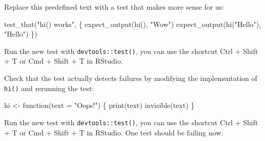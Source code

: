 \documentclass[]{book}
\newenvironment{Shaded}{}{}
\newcommand{\ControlFlowTok}[1]{\textcolor[rgb]{0.00,0.00,1.00}{#1}}
\newcommand{\DataTypeTok}[1]{#1}
\newcommand{\KeywordTok}[1]{\textcolor[rgb]{0.00,0.00,1.00}{#1}}
\newcommand{\NormalTok}[1]{#1}
\newcommand{\StringTok}[1]{\textcolor[rgb]{0.00,0.50,0.50}{#1}}
\begin{document}
Replace this predefined text with a test that makes more sense for us:

\begin{Shaded}
\begin{Highlighting}[]
\KeywordTok{test_that}\NormalTok{(}\StringTok{"hi() works"}\NormalTok{, \{}
  \KeywordTok{expect_output}\NormalTok{(}\KeywordTok{hi}\NormalTok{(), }\StringTok{"Wow"}\NormalTok{)}
  \KeywordTok{expect_output}\NormalTok{(}\KeywordTok{hi}\NormalTok{(}\StringTok{"Hello"}\NormalTok{), }\StringTok{"Hello"}\NormalTok{)}
\NormalTok{\})}
\end{Highlighting}
\end{Shaded}

Run the new test with \texttt{devtools::test()}, you can use the shortcut Ctrl + Shift + T or Cmd + Shift + T in RStudio.

Check that the test actually detects failures by modifying the implementation of \texttt{hi()} and rerunning the test:

\begin{Shaded}
\begin{Highlighting}[]
\NormalTok{hi <-}\StringTok{ }\ControlFlowTok{function}\NormalTok{(}\DataTypeTok{text =} \StringTok{"Oops!"}\NormalTok{) \{}
  \KeywordTok{print}\NormalTok{(text)}
  \KeywordTok{invisible}\NormalTok{(text)}
\NormalTok{\}}
\end{Highlighting}
\end{Shaded}

Run the new test with \texttt{devtools::test()}, you can use the shortcut Ctrl + Shift + T or Cmd + Shift + T in RStudio.
One test should be failing now.

\hypertarget{section-1}{%
\chapter{}\label{section-1}}
\end{document}

